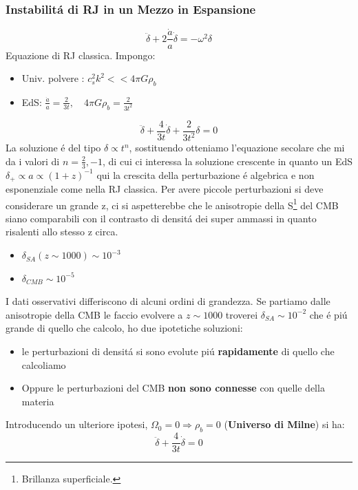 \documentclass[12pt, a4paper]{article}
\begin{document}
\subsubsection{Instabilit\'{a} di RJ in un Mezzo in Espansione}
\begin{equation}
\ddot{\delta}+2\frac{\dot{a}}{a}\dot{\delta}=-\omega^2 \delta
\label{eq:rjexp}
\end{equation}
Equazione di RJ classica. Impongo:
\begin{itemize}
\item Univ. polvere : $c_s^2k^2<<4\pi G\rho_b$
\item EdS: $\frac{\dot{a}}{a}=\frac{2}{3t}, \quad 4\pi G\rho_b=\frac{2}{3t^2}$
\end{itemize}
\begin{equation}
\ddot{\delta}+\frac{4}{3t}\dot{\delta}+ \frac{2}{3t^2}\delta=0
\end{equation}
La soluzione \'{e} del tipo $\delta \propto t^n$, sostituendo otteniamo l'equazione secolare che mi da i valori di $n=\frac{2}{3}, -1$, di cui ci interessa la soluzione crescente in quanto un EdS $\delta_+\propto a\propto (1+z)^{-1}$ qui la crescita della perturbazione \'{e} algebrica e non esponenziale come nella RJ classica. Per avere piccole perturbazioni si deve considerare un grande z, ci si aspetterebbe che le anisotropie della S\footnote{Brillanza superficiale.} del CMB siano comparabili con il contrasto di densit\'{a}  dei super ammassi in quanto risalenti allo stesso z circa. 
\begin{itemize}
\item $\delta_{SA}(z\sim 1000)\sim 10^{-3}$
\item $\delta_{CMB}\sim 10^{-5}$
\end{itemize}
I dati osservativi differiscono di alcuni ordini di grandezza. Se partiamo dalle anisotropie della CMB le faccio evolvere a $z\sim 1000$ troverei $\delta_{SA} \sim 10^{-2}$ che \'{e} pi\'{u} grande di 	quello che calcolo, ho due ipotetiche soluzioni:
\begin{itemize}
\item le perturbazioni di densit\'{a} si sono evolute pi\'{u} \textbf{rapidamente} di quello che calcoliamo
\item Oppure le perturbazioni del CMB \textbf{non sono connesse} con quelle della materia
\end{itemize}
Introducendo un ulteriore ipotesi, $\Omega_0=0\Rightarrow \rho_b=0$ (\textbf{Universo di Milne}) si ha:
\begin{equation}
\ddot{\delta}+\frac{4}{3t}\dot{\delta}=0
\end{equation}
\end{document}

